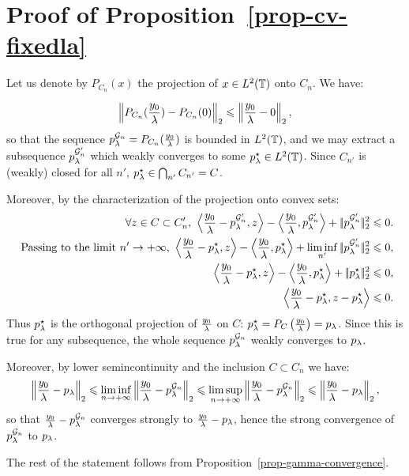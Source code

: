 \section{Proof of Proposition~\ref{prop-cv-fixedla}}
\label{sec-proof2}

Let us denote by $P_{C_n}(x)$ the projection of $x\in L^2(\mathbb{T})$ onto $C_n$. We have:

\begin{align*}
\left\| P_{C_n}(\frac{y_0}{\lambda})-P_{C_n}(0)\right\|_2 \leqslant \left\| \frac{y_0}{\lambda} - 0\right\|_2,
\end{align*}
so that the sequence $p_{\lambda}^{\mathcal{G}_n}=P_{C_n}(\frac{y_0}{\lambda})$ is bounded in $L^2(\mathbb{T})$, and we may extract a subsequence $p_{\lambda}^{\mathcal{G}_n'}$
which weakly converges to some $p_\lambda^\star\in L^2(\mathbb{T})$. Since $C_{n'}$ is (weakly) closed for all $n'$, $p_\lambda^\star\in \bigcap_{n'} C_{n'}=C$.

Moreover, by the characterization of the projection onto convex sets:
\begin{align*}
\forall z\in C\subset C_n', \ \left\langle \frac{y_0}{\lambda} - p_{\lambda}^{\mathcal{G}_n'},z\right\rangle  - \left\langle \frac{y_0}{\lambda},p_{\lambda}^{\mathcal{G}_n'}\right\rangle +|\!| p_{\lambda}^{\mathcal{G}_n'} |\!|_2^2 &\leqslant 0.\\
\mbox{ Passing to the limit } n'\to +\infty, \ \left\langle \frac{y_0}{\lambda} - p_{\lambda}^\star,z\right\rangle - \left\langle \frac{y_0}{\lambda},p_{\lambda}^\star\right\rangle + \liminf_{n'} |\!| p_{\lambda}^{\mathcal{G}_n'} |\!|_2^2 &\leqslant 0,\\
 \left\langle \frac{y_0}{\lambda} - p_{\lambda}^\star,z\right\rangle  - \left\langle \frac{y_0}{\lambda},p_{\lambda}^\star\right\rangle + |\!| p_{\lambda}^\star |\!|_2^2 &\leqslant 0,\\
 \left\langle \frac{y_0}{\lambda} - p_\lambda^\star,z - p_\lambda^\star\right\rangle &\leqslant 0.\\
\end{align*}
Thus $p_\lambda^\star$ is the orthogonal projection of $\frac{y_0}{\lambda}$ on $C$: $p_\lambda^\star=P_{C}\left(\frac{y_0}{\lambda}\right)=p_\lambda$.
Since this is true for any subsequence, the whole sequence $p_{\lambda}^{\mathcal{G}_n}$ weakly converges to $p_\lambda$.

Moreover, by lower semincontinuity and the inclusion $C\subset C_n$ we have:
\begin{align*}
\left\|\frac{y_0}{\lambda}-p_\lambda\right\|_2 &\leqslant \liminf_{n\to +\infty} \left\|\frac{y_0}{\lambda}-p_{\lambda}^{\mathcal{G}_n}\right\|_2\leqslant \limsup_{n\to +\infty}\left\|\frac{y_0}{\lambda}-p_{\lambda}^{\mathcal{G}_n}\right\|_2 \leqslant \left\|\frac{y_0}{\lambda}-p_{\lambda}\right\|_2, \\
\end{align*}
so that $\frac{y_0}{\lambda}-p_{\lambda}^{\mathcal{G}_n}$ converges strongly to $\frac{y_0}{\lambda}-p_{\lambda}$,
 hence the strong convergence of $p_{\lambda}^{\mathcal{G}_n}$ to $p_\lambda$.

The rest of the statement follows from Proposition~\ref{prop-gamma-convergence}.
